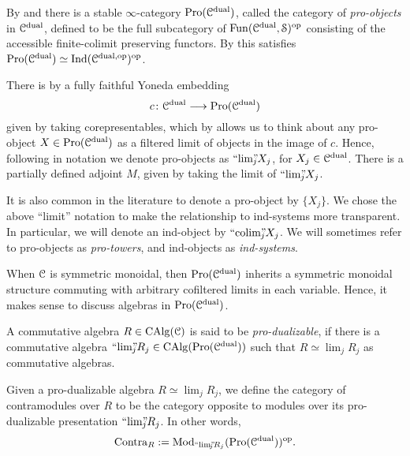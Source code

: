 \begin{construction}
    By \cite[A.8.1.1]{lurie_SAG} and \cite[2.5]{kerz-saito-tamme_2019} there is a stable $\infty$-category $\operatorname{Pro}(\EuScript{C}^{\mathrm{dual}})$, called the category of \emph{pro-objects} in $\EuScript{C}^{\mathrm{dual}}$, defined to be the full subcategory of $\operatorname{Fun}(\EuScript{C}^{\mathrm{dual}}, \EuScript{S})^{\mathrm{op}}$ consisting of the accessible finite-colimit preserving functors. By \cite[A.8.1.2]{lurie_SAG} this satisfies $\operatorname{Pro}(\EuScript{C}^{\mathrm{dual}}) \simeq \operatorname{Ind}(\EuScript{C}^{\mathrm{dual}, \mathrm{op}})^{\mathrm{op}}$. 
\end{construction}

There is by \cite[A.8.1.3]{lurie_SAG} a fully faithful Yoneda embedding 
\[c\colon \EuScript{C}^{\mathrm{dual}} \longrightarrow \operatorname{Pro}(\EuScript{C}^{\mathrm{dual}})\] 
given by taking corepresentables, which by \cite[A.8.1.5]{lurie_SAG} allows us to think about any pro-object $X \in \operatorname{Pro}(\EuScript{C}^{\mathrm{dual}})$ as a filtered limit of objects in the image of $c$. Hence, following \cite{kerz-saito-tamme_2019} in notation we denote pro-objects as $``\!\lim\!"_{\hspace{-5pt} j} X_j$, for $X_j \in \EuScript{C}^{\mathrm{dual}}$. There is a partially defined adjoint $M$, given by taking the limit of $``\!\lim\!"_{\hspace{-5pt} j} X_j$. 

\begin{remark}
    It is also common in the literature to denote a pro-object by $\{X_j\}$. We chose the above ``limit'' notation to make the relationship to ind-systems more transparent. In particular, we will denote an ind-object by $``\!\operatorname{colim}\!"_{\hspace{-5pt} j} X_j$. We will sometimes refer to pro-objects as \emph{pro-towers}, and ind-objects as \emph{ind-systems}.  
\end{remark}

When $\EuScript{C}$ is symmetric monoidal, then $\operatorname{Pro}(\EuScript{C}^{\mathrm{dual}})$ inherits a symmetric monoidal structure commuting with arbitrary cofiltered limits in each variable. Hence, it makes sense to discuss algebras in $\operatorname{Pro}(\EuScript{C}^{\mathrm{dual}})$. 

\begin{definition}
    A commutative algebra $R\in \operatorname{CAlg}(\EuScript{C})$ is said to be \emph{pro-dualizable}, if there is a commutative algebra $``\!\lim\!"_{\hspace{-5pt} j} R_j \in \operatorname{CAlg}(\operatorname{Pro}(\EuScript{C}^{\mathrm{dual}}))$ such that $R\simeq \lim_j R_j$ as commutative algebras.  
\end{definition}

\begin{definition}
    Given a pro-dualizable algebra $R \simeq \lim_j R_j$, we define the category of contramodules over $R$ to be the category opposite to modules over its pro-dualizable presentation $``\!\lim\!"_{\hspace{-5pt} j} R_j$. In other words, 
    \[\mathrm{Contra}_R := \mathrm{Mod}_{``\!\lim\!"_{\hspace{-5pt} j} R_j}(\operatorname{Pro}(\EuScript{C}^{\mathrm{dual}}))^{\mathrm{op}}.\]
\end{definition}

